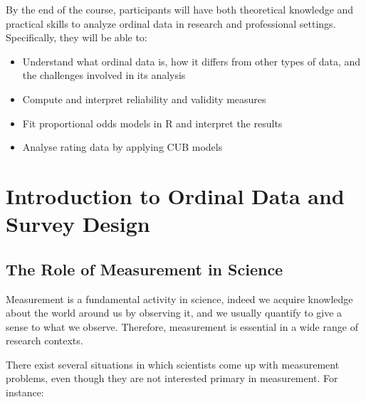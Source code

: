 \documentclass[
]{article}
\providecommand{\tightlist}{%
  \setlength{\itemsep}{0pt}\setlength{\parskip}{0pt}}\usepackage{longtable,booktabs,array}
\begin{document}
By the end of the course, participants will have both theoretical
knowledge and practical skills to analyze ordinal data in research and
professional settings. Specifically, they will be able to:

\begin{itemize}
\tightlist
\item
  Understand what ordinal data is, how it differs from other types of
  data, and the challenges involved in its analysis
\item
  Compute and interpret reliability and validity measures
\item
  Fit proportional odds models in R and interpret the results
\item
  Analyse rating data by applying CUB models
\end{itemize}

\hypertarget{introduction-to-ordinal-data-and-survey-design}{%
\section{Introduction to Ordinal Data and Survey
Design}\label{introduction-to-ordinal-data-and-survey-design}}

\hypertarget{the-role-of-measurement-in-science}{%
\subsection{The Role of Measurement in
Science}\label{the-role-of-measurement-in-science}}

Measurement is a fundamental activity in science, indeed we acquire
knowledge about the world around us by observing it, and we usually
quantify to give a sense to what we observe. Therefore, measurement is
essential in a wide range of research contexts.

There exist several situations in which scientists come up with
measurement problems, even though they are not interested primary in
measurement. For instance:
\end{document}
